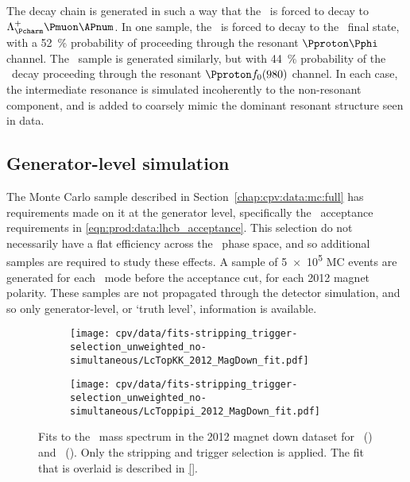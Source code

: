 The decay chain is generated in such a way that the \PLambdab\ is forced to 
decay to $\PLambdac\Pmuon\APnum$.
In one sample, the \PLambdac\ is forced to decay to the \pKK\ final state, with 
a \SI{52}{\percent} probability of proceeding through the resonant 
$\Pproton\Pphi$ channel.
The \ppipi\ sample is generated similarly, but with \SI{44}{\percent} 
probability of the \LcToppipi\ decay proceeding through the resonant $\Pproton 
f_{0}(980)$ channel.
In each case, the intermediate resonance is simulated incoherently to the 
non-resonant component, and is added to coarsely mimic the dominant resonant 
structure seen in data.

\subsection{Generator-level simulation}
\label{chap:cpv:data:mc:gen}

The Monte Carlo sample described in Section~\ref{chap:cpv:data:mc:full} has 
requirements made on it at the generator level, specifically the \lhcb\ 
acceptance requirements in \cref{eqn:prod:data:lhcb_acceptance}.
This selection do not necessarily have a flat efficiency across the \LcTophh\ 
phase space, and so additional samples are required to study these effects.
A sample of \num{5e5} \ac{MC} events are generated for each \LcTophh\ mode 
before the acceptance cut, for each 2012 magnet polarity.
These samples are not propagated through the detector simulation, and so only 
generator-level, or `truth level', information is available.

\begin{table}
  \centering
  \caption{%
    Integrated luminosity for each data sample used in the analysis.
  }
  \label{tab:cpv:data:luminosity}
  
\end{table}

\begin{figure}
  \begin{subfigure}[b]{0.5\textwidth}
    \texttt{[image: cpv/data/fits-stripping\_trigger-selection\_unweighted\_no-simultaneous/LcTopKK\_2012\_MagDown\_fit.pdf]}
    \caption{\pKK}
    \label{fig:cpv:data:mass:pKK}
  \end{subfigure}
  \begin{subfigure}[b]{0.5\textwidth}
    \texttt{[image: cpv/data/fits-stripping\_trigger-selection\_unweighted\_no-simultaneous/LcToppipi\_2012\_MagDown\_fit.pdf]}
    \caption{\ppipi}
    \label{fig:cpv:data:mass:ppipi}
  \end{subfigure}
  \caption{%
    Fits to the \PLambdac\ mass spectrum in the 2012 magnet down dataset for 
    \pKK\ () and \ppipi\ 
    ().
    Only the stripping and trigger selection is applied.
    The fit that is overlaid is described in \cref{}.
  }
  \label{fig:cpv:data:mass}
\end{figure}
